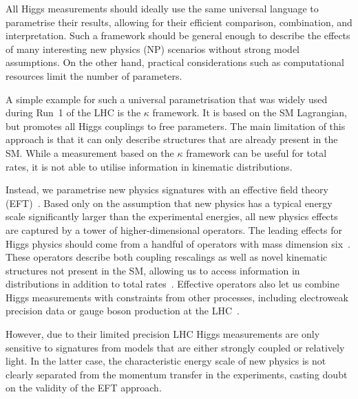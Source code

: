 \newparagraph
%
All Higgs measurements should ideally use
the same universal language to parametrise their results, allowing for
their efficient comparison, combination, and interpretation. Such a
framework should be general enough to describe the effects of many
interesting new physics (NP) scenarios without strong model
assumptions.  On the other hand, practical considerations such as
computational resources limit the number of parameters.
%

A simple example for such a universal parametrisation that was widely
used during Run~1 of the LHC is the $\kappa$ framework. It is based on
the SM Lagrangian, but promotes all Higgs couplings to free
parameters. The main limitation of this approach is that it can only
describe structures that are already present in the SM. While a
measurement based on the $\kappa$ framework can be useful for total
rates, it is not able to utilise information in kinematic
distributions.

Instead, we parametrise new physics signatures with an effective field
theory (EFT)~\cite{Coleman:1969sm, Callan:1969sn,
  Weinberg:1980wa}. Based only on the assumption that new physics has
a typical energy scale significantly larger than the experimental
energies, all new physics effects are captured by a tower of
higher-dimensional operators. The leading effects for Higgs physics
should come from a handful of operators with mass dimension
six~\cite{Burges:1983zg, Leung:1984ni, Buchmuller:1985jz}. These
operators
%
%
describe both coupling rescalings as well as novel kinematic
structures not present in the SM, allowing us to access information in
distributions in addition to total rates~\cite{Corbett:2012ja,
  Corbett:2015ksa}. Effective operators also let us combine Higgs
measurements with constraints from other processes, including
electroweak precision data or gauge boson production at the
LHC~\cite{Butter:2016cvz}.

However, due to their limited precision LHC Higgs measurements are
only sensitive to signatures from models that are either strongly
coupled or relatively light. In the latter case, the characteristic
energy scale of new physics is not clearly separated from the momentum
transfer in the experiments, casting doubt on the validity of the EFT
approach.

